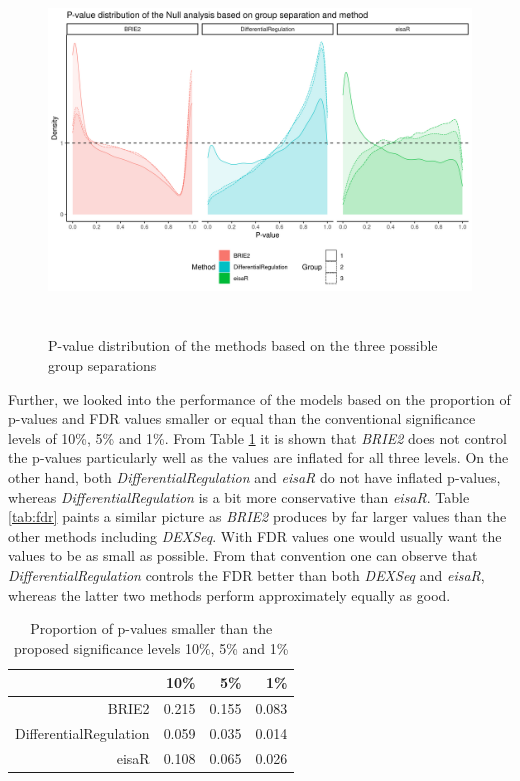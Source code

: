 \begin{figure}[!htb]
\begin{center}
\includegraphics[width=6in,height=3.8in]{../figures/null_analysis/p_value_distribution.png}
\end{center}
\caption{P-value distribution of the methods based on the three possible group separations}
\label{fig:null_p_values}
\end{figure}

Further, we looked into the performance of the models based on the proportion of p-values and FDR values smaller or equal than the conventional significance levels of 10\%, 5\% and 1\%. From Table \ref{tab:p_val} it is shown that \emph{BRIE2} does not control the p-values particularly well as the values are inflated for all three levels. On the other hand, both \emph{DifferentialRegulation} and \emph{eisaR} do not have inflated p-values, whereas \emph{DifferentialRegulation} is a bit more conservative than \emph{eisaR}. Table \ref{tab:fdr} paints a similar picture as \emph{BRIE2} produces by far larger values than the other methods including \emph{DEXSeq}. With FDR values one would usually want the values to be as small as possible. From that convention one can observe that \emph{DifferentialRegulation} controls the FDR better than both \emph{DEXSeq} and \emph{eisaR}, whereas the latter two methods perform approximately equally as good.

\begin{table}[!htb]
\centering
\caption{Proportion of p-values smaller than the proposed significance levels 10\%, 5\% and 1\%}
\begin{tabular}{rrrr}
  \hline
	& 10\% & 5\% & 1\% \\ 
  \hline
	BRIE2 & 0.215 & 0.155 & 0.083 \\ 
  DifferentialRegulation & 0.059 & 0.035 & 0.014 \\ 
  eisaR & 0.108 & 0.065 & 0.026 \\ 
   \hline
\end{tabular}
\label{tab:p_val}
\end{table}

